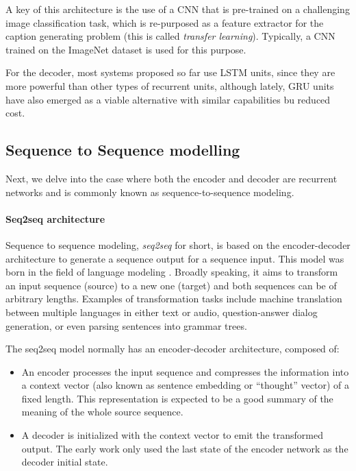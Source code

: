 A key of this architecture is the use of a CNN that is pre-trained on a challenging image classification task, which is re-purposed as a feature extractor for the caption generating problem (this is called \textit{transfer learning}). Typically, a CNN trained on the ImageNet dataset is used for this purpose.

For the decoder, most systems proposed so far use LSTM units, since they are more powerful than other types of recurrent units, although lately, GRU units have also emerged as a viable alternative with similar capabilities bu reduced cost.

\subsection{Sequence to Sequence  modelling}\label{subsec:seq2seq}

Next, we delve into the case where both the encoder and decoder are recurrent networks and is commonly known as sequence-to-sequence modeling.

\paragraph{Seq2seq architecture}
Sequence to sequence modeling, \textit{seq2seq} for short, is based on the encoder-decoder architecture to generate a sequence output for a sequence input. This model was born in the field of language modeling \citep{Sutskever2014}. Broadly speaking, it aims to transform an input sequence (source) to a new one (target) and both sequences can be of arbitrary lengths. Examples of transformation tasks include machine translation between multiple languages in either text or audio, question-answer dialog generation, or even parsing sentences into grammar trees.

The seq2seq model normally has an encoder-decoder architecture, composed of:
\begin{itemize}
    \item An encoder processes the input sequence and compresses the information into a context vector (also known as sentence embedding or “thought” vector) of a fixed length. This representation is expected to be a good summary of the meaning of the whole source sequence.
    \item A decoder is initialized with the context vector to emit the transformed output. The early work only used the last state of the encoder network as the decoder initial state.
\end{itemize}    

